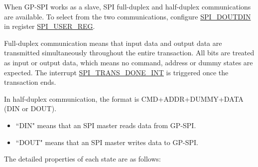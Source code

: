 \documentclass[main\_\_EN.tex]{subfiles}
\begin{document}
When GP-SPI works as a slave, SPI full-duplex and half-duplex communications are available. To select from the two communications, configure \hyperref[fielddesc:SPIDOUTDIN]{SPI\_DOUTDIN} in register \hyperref[regdesc:SPIUSERREG]{SPI\_USER\_REG}.

Full-duplex communication means that input data and output data are transmitted simultaneously throughout the entire transaction. All bits are treated as input or output data, which means no command, address or dummy states are expected. The interrupt \hyperref[int:SPITRANSDONEINT]{SPI\_TRANS\_DONE\_INT} is triggered once the transaction ends.

In half-duplex communication, the format is CMD+ADDR+DUMMY+DATA (DIN or DOUT).
\begin{itemize}
    \item``DIN" means that an SPI master reads data from GP-SPI.
    \item``DOUT" means that an SPI master writes data to GP-SPI.
\end{itemize}

The detailed properties of each state are as follows:
\end{document}
